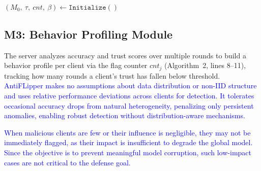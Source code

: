 \documentclass[conference]{IEEEtran}
\begin{document}
\IncMargin{1em}
\setlength{\textfloatsep}{0pt}
\begin{algorithm}[t]
  \caption{\texttt{AntiFLipper()}}\label{alg:antiflipper}
  \Indm 
  \Indp
  \BlankLine

  $(M_0,\ \tau,\ cnt,\ \beta) \leftarrow \texttt{Initialize}()$\\


\end{algorithm}
\DecMargin{1em}

\subsection{M3: Behavior Profiling Module}
The server analyzes accuracy and trust scores over multiple rounds to build a behavior profile per client via the flag counter $cnt_j$ (Algorithm~2, lines 8--11), tracking how many rounds a client's trust has fallen below threshold. \textcolor{blue}{AntiFLipper makes no assumptions about data distribution or non-IID structure and uses relative performance deviations across clients for detection. It tolerates occasional accuracy drops from natural heterogeneity, penalizing only persistent anomalies, enabling robust detection without distribution-aware mechanisms.}

\textcolor{blue}{When malicious clients are few or their influence is negligible, they may not be immediately flagged, as their impact is insufficient to degrade the global model. Since the objective is to prevent meaningful model corruption, such low-impact cases are not critical to the defense goal.}
\end{document}
